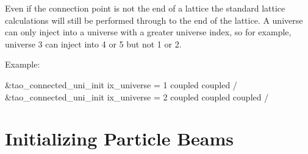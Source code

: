 {{{{{{{{{{{{Even if the connection point is not the end of a lattice the standard lattice
calculations will still be performed through to the end of the
lattice.  A universe can only inject into a universe with a greater
universe index, so for example, universe 3 can inject into 4 or 5 but
not 1 or 2.

Example:
\begin{example}
  &tao_connected_uni_init
    ix_universe = 1
    coupled%
    coupled%
  /
  &tao_connected_uni_init
    ix_universe = 2
    coupled%
    coupled%
    coupled%
  /
\end{example}

\section{Initializing Particle Beams}
\label{s:beam.init}

}}}}}}}}}}}}
